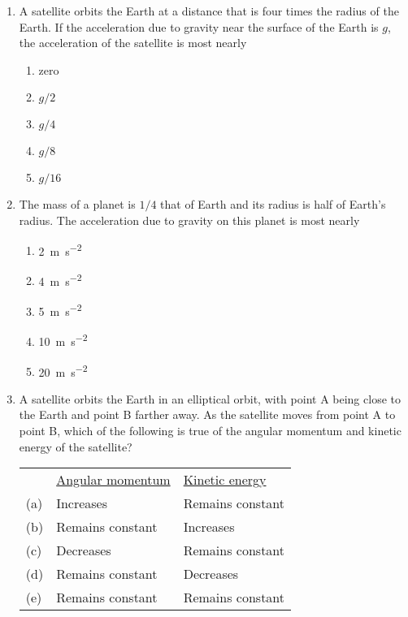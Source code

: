 \documentclass{../../oss-apphys}
\begin{document}
\begin{multicols}{2}
\begin{enumerate}[leftmargin=18pt,resume]
  \item A satellite orbits the Earth at a distance that is four times the radius
    of the Earth. If the acceleration due to gravity near the surface of the
    Earth is $g$, the acceleration of the satellite is most nearly
    \begin{enumerate}[noitemsep,topsep=0pt,leftmargin=18pt,label=(\Alph*)]
    \item zero
    \item $g/2$
    \item $g/4$
    \item $g/8$
    \item $g/16$
    \end{enumerate}

  \item The mass of a planet is $1/4$ that of Earth and its radius is half of
    Earth's radius. The acceleration due to gravity on this planet is most
    nearly
    \begin{enumerate}[noitemsep,topsep=0pt,leftmargin=18pt,label=(\Alph*)]
    \item\SI{2 }{\metre\per\second^2}
    \item\SI{4 }{\metre\per\second^2}
    \item\SI{5 }{\metre\per\second^2}
    \item\SI{10}{\metre\per\second^2}
    \item\SI{20}{\metre\per\second^2}
    \end{enumerate}
  
  \item A satellite orbits the Earth in an elliptical orbit, with point A being
    close to the Earth and point B farther away. As the satellite moves from
    point A to point B, which of the following is true of the angular momentum
    and kinetic energy of the satellite?
    \begin{center}
      \vspace{-.1in}
    \end{center}
  
    \begin{tabular}{lll}
      & \underline{Angular momentum} & \underline{Kinetic energy}\\
      (a) & Increases & Remains constant \\
      (b) & Remains constant & Increases \\
      (c) & Decreases & Remains constant \\
      (d) & Remains constant & Decreases \\
      (e) & Remains constant & Remains constant
    \end{tabular}


\end{enumerate}
\end{multicols}
\end{document}
